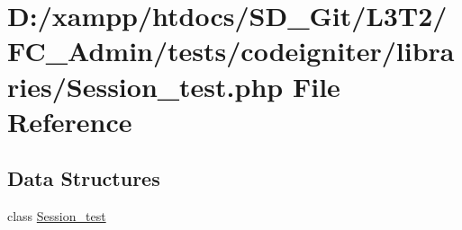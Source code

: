 \hypertarget{_session__test_8php}{}\section{D\+:/xampp/htdocs/\+S\+D\+\_\+\+Git/\+L3\+T2/\+F\+C\+\_\+\+Admin/tests/codeigniter/libraries/\+Session\+\_\+test.php File Reference}
\label{_session__test_8php}
\subsection*{Data Structures}
\begin{DoxyCompactItemize}
\item 
class \hyperlink{class_session__test}{Session\+\_\+test}
\end{DoxyCompactItemize}
